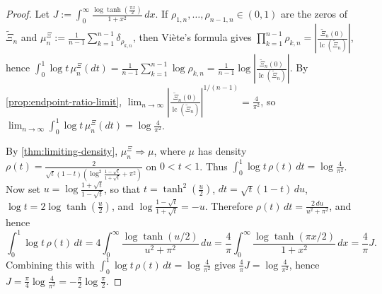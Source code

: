 \documentclass[11pt,twoside]{article}
\numberwithin{equation}{section}
\begin{document}
\begin{proof}
Let $\displaystyle J:=\int_{0}^{\infty}\frac{\log \tanh\!\left(\frac{\pi x}{2}\right)}{1+x^{2}}\,dx$.
If $\displaystyle \rho_{1,n},\dots,\rho_{n-1,n}\in(0,1)$ are the zeros of $\widetilde{\Xi}_n$ and $\displaystyle \mu_n^{\Xi}:=\frac1{n-1}\sum_{k=1}^{n-1}\delta_{\rho_{k,n}}$, then Viète's formula gives
$\displaystyle \prod_{k=1}^{n-1}\rho_{k,n}=\left|\frac{\widetilde{\Xi}_n(0)}{\operatorname{lc}(\widetilde{\Xi}_n)}\right|$,
hence
$\displaystyle \int_0^1 \log t\,\mu_n^{\Xi}(dt)=\frac1{n-1}\sum_{k=1}^{n-1}\log\rho_{k,n}
=\frac1{n-1}\log\left|\frac{\widetilde{\Xi}_n(0)}{\operatorname{lc}(\widetilde{\Xi}_n)}\right|$.
By \cref{prop:endpoint-ratio-limit},
$\displaystyle \lim_{n\to\infty}\left|\frac{\widetilde{\Xi}_n(0)}{\operatorname{lc}(\widetilde{\Xi}_n)}\right|^{1/(n-1)}=\frac{4}{\pi^2}$,
so
$\displaystyle \lim_{n\to\infty}\int_0^1 \log t\,\mu_n^{\Xi}(dt)=\log\frac{4}{\pi^2}$.

By \cref{thm:limiting-density}, $\mu_n^{\Xi}\Rightarrow\mu$, where $\mu$ has density
$\displaystyle \rho(t)=\frac{2}{\sqrt{t}(1-t)\left(\log^2\!\frac{1-\sqrt{t}}{1+\sqrt{t}}+\pi^2\right)}$ on $0<t<1$.
Thus $\displaystyle \int_0^1 \log t\,\rho(t)\,dt=\log\frac{4}{\pi^2}$.
Now set $\displaystyle u=\log\frac{1+\sqrt{t}}{1-\sqrt{t}}$, so that $\displaystyle t=\tanh^2\!\left(\frac{u}{2}\right)$, $\displaystyle dt=\sqrt{t}(1-t)\,du$, $\displaystyle \log t=2\log\tanh\!\left(\frac{u}{2}\right)$, and $\displaystyle \log\frac{1-\sqrt{t}}{1+\sqrt{t}}=-u$.
Therefore $\displaystyle \rho(t)\,dt=\frac{2\,du}{u^2+\pi^2}$, and hence
\[
\int_0^1 \log t\,\rho(t)\,dt
=
4\int_0^\infty \frac{\log\tanh(u/2)}{u^2+\pi^2}\,du
=
\frac{4}{\pi}\int_0^\infty \frac{\log\tanh(\pi x/2)}{1+x^2}\,dx
=
\frac{4}{\pi}J.
\]
Combining this with $\displaystyle \int_0^1 \log t\,\rho(t)\,dt=\log\frac{4}{\pi^2}$ gives
$\displaystyle \frac{4}{\pi}J=\log\frac{4}{\pi^2}$, hence
$\displaystyle J=\frac{\pi}{4}\log\frac{4}{\pi^2}=-\frac{\pi}{2}\log\frac{\pi}{2}$.
\end{proof}
\end{document}
